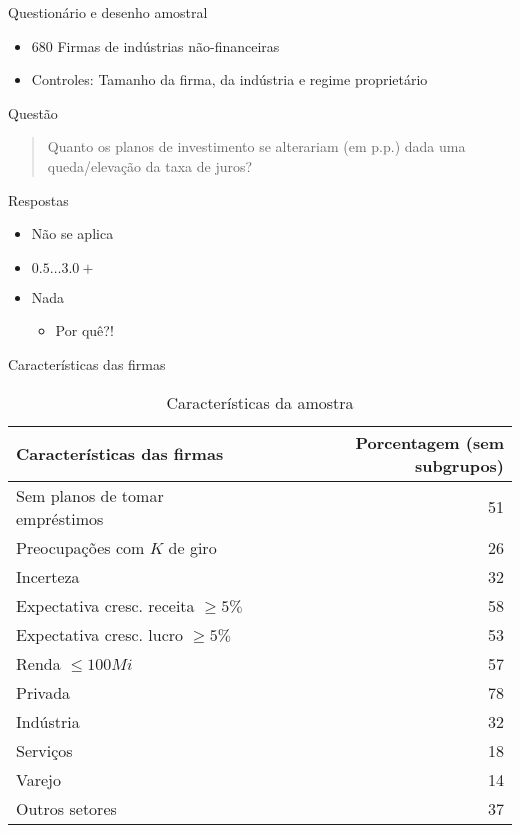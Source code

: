 \documentclass[presentation]{beamer}
\begin{document}
\begin{frame}[label={sec:orgb1f6d7f}]{Questionário e desenho amostral}
\begin{itemize}
\item 680 Firmas de indústrias não-financeiras
\item \alert{Controles:} Tamanho da firma, da indústria e regime proprietário
\end{itemize}


\begin{block}{Questão}
\begin{quote}
Quanto os planos de investimento se alterariam (em p.p.) dada uma queda/elevação da taxa de juros?
\end{quote}
\end{block}

\begin{block}{Respostas}
\begin{itemize}
\item Não se aplica
\item \(0.5 \ldots 3.0+\)
\item Nada
\begin{itemize}
\item Por quê?!
\end{itemize}
\end{itemize}
\end{block}
\end{frame}

\begin{frame}[label={sec:org2f01a48}]{Características das firmas}
\begin{table}[htbp]
\caption{Características da amostra}
\centering
\begin{tabular}{lr}
\hline
Características das firmas & Porcentagem (sem subgrupos)\\
\hline
Sem planos de tomar empréstimos & 51\\
Preocupações com \(K\) de giro & 26\\
\hline
Incerteza & 32\\
Expectativa cresc. receita \(\geq 5\%\) & 58\\
Expectativa cresc. lucro \(\geq 5\%\) & 53\\
Renda \(\leq 100 Mi\) & 57\\
Privada & 78\\
\hline
Indústria & 32\\
Serviços & 18\\
Varejo & 14\\
Outros setores & 37\\
\hline
\end{tabular}
\end{table}
\end{frame}
\end{document}
